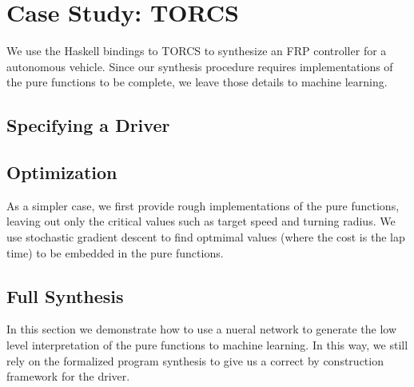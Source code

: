 \section{Case Study: TORCS}

We use the Haskell bindings to TORCS to synthesize an FRP controller for a autonomous vehicle.
Since our synthesis procedure requires implementations of the pure functions to be complete, we leave those details to machine learning.

\subsection{Specifying a Driver}

\subsection{Optimization}
As a simpler case, we first provide rough implementations of the pure functions, leaving out only the critical values such as target speed and turning radius.
We use stochastic gradient descent to find optmimal values (where the cost is the lap time) to be embedded in the pure functions.


\subsection{Full Synthesis}
In this section we demonstrate how to use a nueral network to generate the low level interpretation of the pure functions to machine learning.
In this way, we still rely on the formalized program synthesis to give us a correct by construction framework for the driver.


